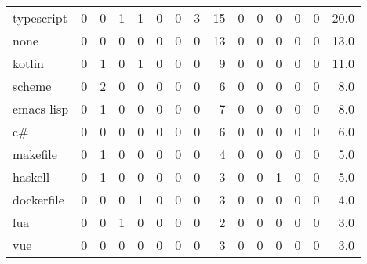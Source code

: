 \begin{tabular}{lrrrrrrrrrrrrrr}
typescript       &        0 &       0 &          1 &               1 &                0 &       0 &          3 &         15 &         0 &         0 &      0 &             0 &         0 &     20.0 \\
none             &        0 &       0 &          0 &               0 &                0 &       0 &          0 &         13 &         0 &         0 &      0 &             0 &         0 &     13.0 \\
kotlin           &        0 &       1 &          0 &               1 &                0 &       0 &          0 &          9 &         0 &         0 &      0 &             0 &         0 &     11.0 \\
scheme           &        0 &       2 &          0 &               0 &                0 &       0 &          0 &          6 &         0 &         0 &      0 &             0 &         0 &      8.0 \\
emacs lisp       &        0 &       1 &          0 &               0 &                0 &       0 &          0 &          7 &         0 &         0 &      0 &             0 &         0 &      8.0 \\
c\#               &        0 &       0 &          0 &               0 &                0 &       0 &          0 &          6 &         0 &         0 &      0 &             0 &         0 &      6.0 \\
makefile         &        0 &       1 &          0 &               0 &                0 &       0 &          0 &          4 &         0 &         0 &      0 &             0 &         0 &      5.0 \\
haskell          &        0 &       1 &          0 &               0 &                0 &       0 &          0 &          3 &         0 &         0 &      1 &             0 &         0 &      5.0 \\
dockerfile       &        0 &       0 &          0 &               1 &                0 &       0 &          0 &          3 &         0 &         0 &      0 &             0 &         0 &      4.0 \\
lua              &        0 &       0 &          1 &               0 &                0 &       0 &          0 &          2 &         0 &         0 &      0 &             0 &         0 &      3.0 \\
vue              &        0 &       0 &          0 &               0 &                0 &       0 &          0 &          3 &         0 &         0 &      0 &             0 &         0 &      3.0 \\

\end{tabular}
